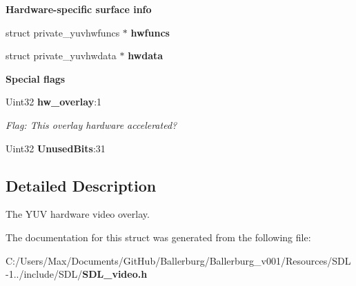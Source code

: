 \begin{Indent}{\bf Hardware-\/specific surface info}\par
\begin{DoxyCompactItemize}
\item 
struct private\+\_\+yuvhwfuncs $\ast$ {\bfseries hwfuncs}\label{struct_s_d_l___overlay_aba6df163c475c57ba729bd9b86f87963}

\item 
struct private\+\_\+yuvhwdata $\ast$ {\bfseries hwdata}\label{struct_s_d_l___overlay_acc40482a067d5c106747dab61bcee3c4}

\end{DoxyCompactItemize}
\end{Indent}
\begin{Indent}{\bf Special flags}\par
\begin{DoxyCompactItemize}
\item 
Uint32 {\bf hw\+\_\+overlay}\+:1\label{struct_s_d_l___overlay_a3c24f3b1805074deb9ce6ef5b14f70dc}

\begin{DoxyCompactList}\small\item\em Flag\+: This overlay hardware accelerated? \end{DoxyCompactList}\item 
Uint32 {\bfseries Unused\+Bits}\+:31\label{struct_s_d_l___overlay_a3dff6185e5d7cba5455b17cbf96d23ed}

\end{DoxyCompactItemize}
\end{Indent}


\subsection{Detailed Description}
The Y\+U\+V hardware video overlay. 

The documentation for this struct was generated from the following file\+:\begin{DoxyCompactItemize}
\item 
C\+:/\+Users/\+Max/\+Documents/\+Git\+Hub/\+Ballerburg/\+Ballerburg\+\_\+v001/\+Resources/\+S\+D\+L-\/1../include/\+S\+D\+L/{\bf S\+D\+L\+\_\+video.\+h}\end{DoxyCompactItemize}
